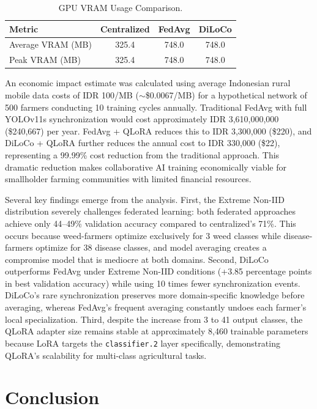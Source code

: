 \documentclass[conference, compsoc, twoside]{IEEEtran}
\begin{document}
\begin{table}[ht]
\centering
\caption{GPU VRAM Usage Comparison. \medskip}
\label{tab:vram}
\small
\begin{tabular}{ l  c  c  c }
\hline
Metric & Centralized & FedAvg & DiLoCo \\
\hline
Average VRAM (MB) & 325.4 & 748.0 & 748.0 \\
Peak VRAM (MB) & 325.4 & 748.0 & 748.0 \\
\hline
\end{tabular}
\end{table}

An economic impact estimate was calculated using average Indonesian rural mobile data costs of IDR 100/MB ($\sim$\$0.0067/MB) for a hypothetical network of 500 farmers conducting 10 training cycles annually. Traditional FedAvg with full YOLOv11s synchronization would cost approximately IDR 3,610,000,000 (\$240,667) per year. FedAvg + QLoRA reduces this to IDR 3,300,000 (\$220), and DiLoCo + QLoRA further reduces the annual cost to IDR 330,000 (\$22), representing a 99.99\% cost reduction from the traditional approach. This dramatic reduction makes collaborative AI training economically viable for smallholder farming communities with limited financial resources.

Several key findings emerge from the analysis. First, the Extreme Non-IID distribution severely challenges federated learning: both federated approaches achieve only 44--49\% validation accuracy compared to centralized's 71\%. This occurs because weed-farmers optimize exclusively for 3 weed classes while disease-farmers optimize for 38 disease classes, and model averaging creates a compromise model that is mediocre at both domains. Second, DiLoCo outperforms FedAvg under Extreme Non-IID conditions (+3.85 percentage points in best validation accuracy) while using 10 times fewer synchronization events. DiLoCo's rare synchronization preserves more domain-specific knowledge before averaging, whereas FedAvg's frequent averaging constantly undoes each farmer's local specialization. Third, despite the increase from 3 to 41 output classes, the QLoRA adapter size remains stable at approximately 8,460 trainable parameters because LoRA targets the \texttt{classifier.2} layer specifically, demonstrating QLoRA's scalability for multi-class agricultural tasks.

\section{Conclusion}
\end{document}
